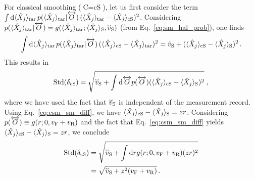 \documentclass[aps,prx,onecolumn,superscriptaddress,floatfix,longbibliography,amsmath,amssymb]{revtex4-2}
\newcommand{\ellipse}{\raisebox{-1pt}{\scalebox{1.3}[.4]{$\circ$}}}
\newcommand{\halo}{\accentset{\ellipse}}
\newcommand{\fil}{_{\text F}}
\newcommand{\rfil}{_{\text R}}
\newcommand{\sm}{_{\text S}}
\newcommand{\tar}{_{\rm tar}}
\newcommand{\dd}{{\rm d}}
\newcommand{\ex}[1]{\langle #1 \rangle}
\newcommand{\both}[1]{\overleftrightarrow{#1}}
\newcommand{\beq}{\begin{equation}}
\newcommand{\eeq}{\end{equation}}
\begin{document}
For classical smoothing ($\text{C}=\text{cS}$), let us first consider the term $\int \dd \ex{\hat{X}_j}\tar\, p(\ex{\hat{X}_j}\tar|\both{O})\,(\ex{\hat{X}_j}\tar-\ex{\hat{X}_j}_{\rm cS})^2$. Considering $p(\ex{\hat{X}_j}\tar|\both{O}) = g(\ex{\hat{X}_j}\tar;\ex{\hat{X}_j}\sm,\halo{v}\sm)$ (from Eq.~\eqref{eq:sm_hal_prob}), one finds
\beq
\int \dd \ex{\hat{X}_j}\tar\, p(\ex{\hat{X}_j}\tar|\both{O})\,(\ex{\hat{X}_j}_{\rm cS} - \ex{\hat{X}_j}\tar)^2 = \tilde{v}\sm + (\ex{\hat{X}_j}_{\rm cS} - \ex{\hat{X}_j}_{\rm S})^2\,.
\eeq
This results in%
\beq
{\rm Std}(\delta_{\text{cS}}) = \sqrt{\halo{v}\sm + \int \dd\both{O} p(\both{O})(\ex{\hat{X}_j}_{\rm cS} - \ex{\hat{X}_j}_{\rm S})^2}\;,\\
\eeq
where we have used the fact that $\halo{v}\sm$ is independent of the measurement record. Using Eq.~\eqref{eq:csm_sm_diff}, we have $\ex{\hat{X}_j}_{\rm cS} - \ex{\hat{X}_j}_{\rm S} = z r$. Considering $p(\both{O}) \equiv g(r;0, v\fil + v\rfil)$ and the fact that Eq.~\eqref{eq:csm_sm_diff} yields $\ex{\hat{X}_j}_{\rm cS} - \ex{\hat{X}_j}_{\rm S} = z r$, we conclude
\begin{align}
{\rm Std}(\delta_{\text{cS}}) &= \sqrt{\halo{v}\sm + \int \dd r g(r;0,v\fil + v\rfil)(zr)^2}\\
&=\sqrt{\halo{v}\sm + z^2(v\fil + v\rfil)}\,.
\end{align}

%
\end{document}
